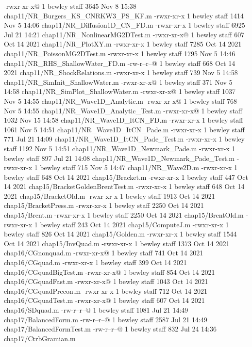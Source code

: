 -rwxr-xr-x@ 1 bewley  staff   3645 Nov  8 15:38 chap11/NR_Burgers_KS_CNRKW3_PS_KF.m
-rwxr-xr-x  1 bewley  staff   1414 Nov  5 14:06 chap11/NR_Diffusion1D_CN_FD.m
-rwxr-xr-x  1 bewley  staff   6925 Jul 21 14:21 chap11/NR_NonlinearMG2DTest.m
-rwxr-xr-x@ 1 bewley  staff    607 Oct 14  2021 chap11/NR_PlotXY.m
-rwxr-xr-x  1 bewley  staff   7285 Oct 14  2021 chap11/NR_PoissonMG2DTest.m
-rwxr-xr-x  1 bewley  staff   1795 Nov  5 14:46 chap11/NR_RHS_ShallowWater_FD.m
-rw-r--r--@ 1 bewley  staff    668 Oct 14  2021 chap11/NR_ShockRelations.m
-rwxr-xr-x  1 bewley  staff    739 Nov  5 14:58 chap11/NR_SimInit_ShallowWater.m
-rwxr-xr-x@ 1 bewley  staff    371 Nov  5 14:58 chap11/NR_SimPlot_ShallowWater.m
-rwxr-xr-x@ 1 bewley  staff   1037 Nov  5 14:55 chap11/NR_Wave1D_Analytic.m
-rwxr-xr-x@ 1 bewley  staff    768 Nov  5 14:55 chap11/NR_Wave1D_Analytic_Test.m
-rwxr-xr-x@ 1 bewley  staff   1032 Nov 15 14:58 chap11/NR_Wave1D_ItCN_FD.m
-rwxr-xr-x  1 bewley  staff   1061 Nov  5 14:51 chap11/NR_Wave1D_ItCN_Pade.m
-rwxr-xr-x  1 bewley  staff    771 Jul 21 14:09 chap11/NR_Wave1D_ItCN_Pade_Test.m
-rwxr-xr-x  1 bewley  staff   1192 Nov  5 14:51 chap11/NR_Wave1D_Newmark_Pade.m
-rwxr-xr-x  1 bewley  staff    897 Jul 21 14:08 chap11/NR_Wave1D_Newmark_Pade_Test.m
-rwxr-xr-x  1 bewley  staff    715 Nov  5 14:47 chap11/NR_Wave2D.m
-rwxr-xr-x  1 bewley  staff    648 Oct 14  2021 chap15/Bracket.m
-rwxr-xr-x  1 bewley  staff    447 Oct 14  2021 chap15/BracketGoldenBrentTest.m
-rwxr-xr-x  1 bewley  staff    648 Oct 14  2021 chap15/BracketOld.m
-rwxr-xr-x  1 bewley  staff   1913 Oct 14  2021 chap15/BracketPress.m
-rwxr-xr-x  1 bewley  staff   2250 Oct 14  2021 chap15/Brent.m
-rwxr-xr-x  1 bewley  staff   2250 Oct 14  2021 chap15/BrentOld.m
-rwxr-xr-x  1 bewley  staff    243 Oct 14  2021 chap15/ComputeJ.m
-rwxr-xr-x  1 bewley  staff    826 Oct 14  2021 chap15/Golden.m
-rwxr-xr-x  1 bewley  staff   1544 Oct 14  2021 chap15/InvQuad.m
-rwxr-xr-x  1 bewley  staff   1373 Oct 14  2021 chap16/CGnonquad.m
-rwxr-xr-x@ 1 bewley  staff    741 Oct 14  2021 chap16/CGquad.m
-rwxr-xr-x  1 bewley  staff    399 Oct 14  2021 chap16/CGquadBigTest.m
-rwxr-xr-x@ 1 bewley  staff    854 Oct 14  2021 chap16/CGquadFast.m
-rwxr-xr-x@ 1 bewley  staff   1043 Oct 14  2021 chap16/CGquadPrecon.m
-rwxr-xr-x  1 bewley  staff    712 Oct 14  2021 chap16/CGquadTest.m
-rwxr-xr-x@ 1 bewley  staff    607 Oct 14  2021 chap16/SDquad.m
-rw-r--r--@ 1 bewley  staff   1081 Jul 21 14:49 chap17/BalancedForm.m
-rw-r--r--@ 1 bewley  staff   2587 Jul 21 14:49 chap17/BalancedFormTest.m
-rw-r--r--@ 1 bewley  staff    832 Jul 24 14:36 chap17/CtrbGramian.m
